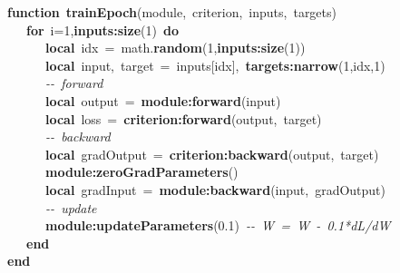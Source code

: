\noindent
\mbox{}\textbf{function}\ \textbf{trainEpoch}(module,\ criterion,\ inputs,\ targets) \\
\mbox{}\ \ \ \textbf{for}\ i=1,\textbf{inputs:size}(1)\ \textbf{do} \\
\mbox{}\ \ \ \ \ \ \textbf{local}\ idx\ =\ math.\textbf{random}(1,\textbf{inputs:size}(1)) \\
\mbox{}\ \ \ \ \ \ \textbf{local}\ input,\ target\ =\ inputs[idx],\ \textbf{targets:narrow}(1,idx,1) \\
\mbox{}\ \ \ \ \ \ \textit{-\/-\ forward} \\
\mbox{}\ \ \ \ \ \ \textbf{local}\ output\ =\ \textbf{module:forward}(input) \\
\mbox{}\ \ \ \ \ \ \textbf{local}\ loss\ =\ \textbf{criterion:forward}(output,\ target) \\
\mbox{}\ \ \ \ \ \ \textit{-\/-\ backward} \\
\mbox{}\ \ \ \ \ \ \textbf{local}\ gradOutput\ =\ \textbf{criterion:backward}(output,\ target) \\
\mbox{}\ \ \ \ \ \ \textbf{module:zeroGradParameters}() \\
\mbox{}\ \ \ \ \ \ \textbf{local}\ gradInput\ =\ \textbf{module:backward}(input,\ gradOutput) \\
\mbox{}\ \ \ \ \ \ \textit{-\/-\ update} \\
\mbox{}\ \ \ \ \ \ \textbf{module:updateParameters}(0.1)\ \textit{-\/-\ W\ =\ W\ -\ 0.1*dL/dW} \\
\mbox{}\ \ \ \textbf{end} \\
\mbox{}\textbf{end}
